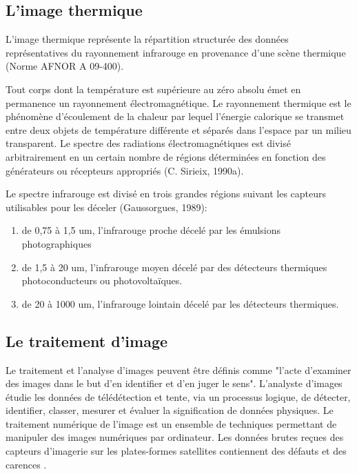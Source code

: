 \documentclass[12pt]{article}
\begin{document}
\subsection{L’image thermique}
L'image thermique représente la répartition structurée des données représentatives du rayonnement infrarouge en provenance d'une scène thermique (Norme AFNOR A 09-400).

Tout corps dont la température est supérieure au zéro absolu émet en permanence un rayonnement électromagnétique. Le rayonnement thermique est le phénomène d'écoulement de la chaleur par lequel l'énergie calorique se transmet entre deux objets de température différente et séparés dans l'espace par un milieu transparent. Le spectre des radiations électromagnétiques est divisé arbitrairement en un certain nombre de régions déterminées en fonction des générateurs ou récepteurs appropriés (C. Sirieix, 1990a).

Le spectre infrarouge est divisé en trois grandes régions suivant les capteurs utilisables pour les déceler (Gaussorgues, 1989):
\begin{enumerate}
	\item de 0,75 à 1,5 um, l'infrarouge proche décelé par les émulsions photographiques
	\item de 1,5 à 20 um, l'infrarouge moyen décelé par des détecteurs thermiques photoconducteurs ou photovoltaïques.
	\item de 20 à 1000 um, l'infrarouge lointain décelé par les détecteurs thermiques.
\end{enumerate}
\newpage
\subsection{Le traitement d’image}
Le traitement et l'analyse d'images peuvent être définis comme "l'acte d'examiner des images dans le but d'en identifier et d'en juger le sens". L'analyste d'images étudie les données de télédétection et tente, via un processus logique, de détecter, identifier, classer, mesurer et évaluer la signification de données physiques. Le traitement numérique de l'image est un ensemble de techniques permettant de manipuler des images numériques par ordinateur. Les données brutes reçues des capteurs d’imagerie sur les plates-formes satellites contiennent des défauts et des carences \cite{14}.
\end{document}

